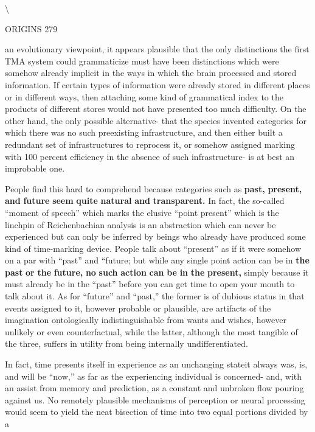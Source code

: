 {\textbackslash}

ORIGINS 279

an evolutionary viewpoint, it appears plausible that the only distinc\-tions the first TMA system could grammaticize must have been dis\-tinctions which were somehow already implicit in the ways in which the brain processed and stored information. If certain types of infor\-mation were already stored in different places or in different ways, then attaching some kind of grammatical index to the products of different stores would not have presented too much difficulty. On the other hand, the only possible alternative- that the species invented cate\-gories for which there was no such preexisting infrastructure, and then either built a redundant set of infrastructures to reprocess it, or some\-how assigned marking with 100 percent efficiency in the absence of such infrastructure- is at best an improbable one.

People find this hard to comprehend because categories such as \textbf{{\textquotedbl}past,{\textquotedbl}} \textbf{{\textquotedbl}present,{\textquotedbl}} \textbf{and} \textbf{{\textquotedbl}future{\textquotedbl}} \textbf{seem} \textbf{quite} \textbf{natural} \textbf{and} \textbf{transparent.} In fact, the so-called ``moment of speech'' which marks the elusive ``point present'' which is the linchpin of Reichenbachian analysis is an abstraction which can never be experienced but can only be inferred by beings who already have produced some kind of time-marking device. People talk about ``present'' as if it were somehow on a par with ``past'' and ``future{\textquotedbl}; but while any single point action can be in \textbf{the} \textbf{{\textquotedbl}past{\textquotedbl}} \textbf{or} \textbf{the} \textbf{{\textquotedbl}future,{\textquotedbl}} \textbf{no} \textbf{such} \textbf{action} \textbf{can} \textbf{be} \textbf{in} \textbf{the} \textbf{{\textquotedbl}present,{\textquotedbl}} simply because it must already be in the ``past'' before you can get time to open your mouth to talk about it. As for ``future'' and ``past,'' the former is of dubious status in that events assigned to it, however probable or plausible, are artifacts of the imagination ontologically indistinguishable from wants and wishes, however unlikely or even counterfactual, while the latter, although the most tangible of the three, suffers in utility from being internally undifferentiated.

In fact, time presents itself in experience as an unchanging state\-it always was, is, and will be ``now,'' as far as the experiencing indi\-vidual is concerned- and, with an assist from memory and prediction, as a constant and unbroken flow pouring against us. No remotely plausible mechanisms of perception or neural processing would seem to yield the neat bisection of time into two equal portions divided by a

